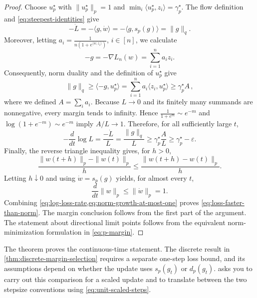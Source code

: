 \documentclass[11pt,twoside]{article}
\theoremstyle{definition}
\theoremstyle{remark}
\begin{document}
\begin{proof}
Choose $u_p^\star$ with $\|u_p^\star\|_p=1$ and
$\min_i\langle u_p^\star,z_i\rangle=\gamma_p^\star$. The flow definition and
\cref{eq:steepest-identities} give
\begin{equation}
 -\dot L=-\langle g,\dot w\rangle=-\langle g,s_p(g)\rangle=\|g\|_q.
 \label{eq:flow-loss-derivative}
\end{equation}
Moreover, letting
$a_i=\frac1{n(1+e^{\langle w,z_i\rangle})}$, $i\in [n]$, we calculate
\begin{equation}
 -g=-\nabla L_n(w)=\sum_{i=1}^n a_i z_i.
 \label{eq:logistic-gradient-combination}
\end{equation}
Consequently, norm duality and the definition of $u_p^\star$ give
\begin{equation}
 \|g\|_q\ge\langle-g,u_p^\star\rangle=\sum_{i=1}^n a_i\langle z_i,u_p^\star\rangle\ge\gamma_p^\star A\,,
 \label{eq:gradient-margin-lower-bound}
\end{equation}
where we defined $A= \sum_i a_i$.
Because $L\to0$ and its finitely many summands are nonnegative, every margin
tends to infinity. Hence
$\frac{1}{1+e^m}\sim e^{-m}$ and $\log(1+e^{-m})\sim e^{-m}$
imply $A/L\to1$. Therefore, for all sufficiently large $t$,
\begin{equation}
 -\frac{d}{dt}\log L=\frac{-\dot L}{L}=\frac{\|g\|_q}{L}\ge\gamma_p^\star\frac{A}{L}\ge\gamma_p^\star-\varepsilon.
 \label{eq:log-loss-rate}
\end{equation}
Finally, the reverse triangle inequality gives, for $h>0$,
\[
 \frac{\|w(t+h)\|_p-\|w(t)\|_p}{h}\le\frac{\|w(t+h)-w(t)\|_p}{h}.
\]
Letting $h\downarrow0$ and using $\dot w=s_p(g)$ yields, for almost every
$t$,
\begin{equation}
 \frac{d}{dt}\|w\|_p\le\|\dot w\|_p=1.
 \label{eq:norm-growth-at-most-one}
\end{equation}
Combining \cref{eq:log-loss-rate,eq:norm-growth-at-most-one} proves
\cref{eq:loss-faster-than-norm}. The margin conclusion follows from the first
part of the argument. The statement about directional limit points follows
from the equivalent norm-minimization formulation in \cref{eq:p-margin}.
\end{proof}

The theorem proves the continuous-time statement. The discrete result in
\cref{thm:discrete-margin-selection} requires a separate one-step loss bound,
and its assumptions depend on whether the update uses $s_p(g_t)$ or
$d_p(g_t)$.  asks you to carry out this
comparison for a scaled update and to translate between the two stepsize
conventions using \cref{eq:unit-scaled-steps}.
\end{document}
